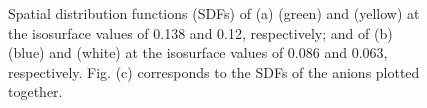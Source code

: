 \documentclass[3p,twocolumn]{elsarticle}
\begin{document}
\begin{figure}[ht]
\centering
{}


\caption{Spatial distribution functions (SDFs) of (a) \ce{[B(CN)_4]^-} (green) and \ce{[emim]^+} (yellow) at the isosurface values of 0.138 and 0.12, respectively; and of (b) \ce{[NTf_2]^-} (blue) and \ce{[emim]^+} (white) at the isosurface values of 0.086 and 0.063, respectively.
Fig. (c) corresponds to the SDFs of the anions plotted together.}
\label{fig:sdf_ions}
\end{figure}
\end{document}
